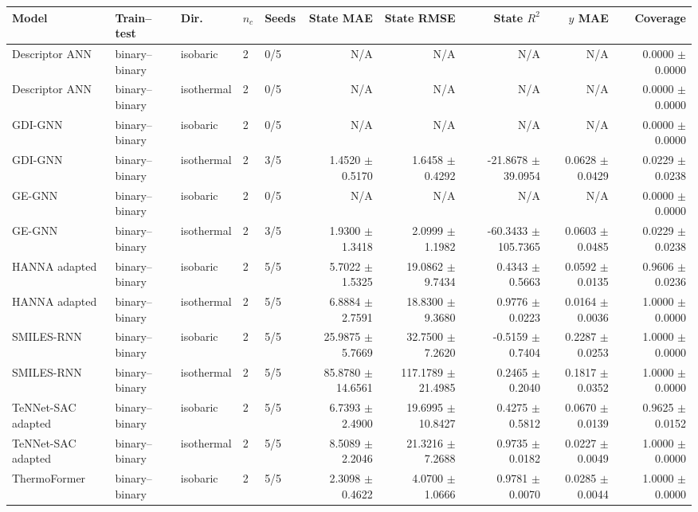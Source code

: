 \begin{tabular}{lllllrrrrr}
Model & Train--test & Dir. & $n_c$ & Seeds & State MAE & State RMSE & State $R^2$ & $y$ MAE & Coverage \\
\hline
Descriptor ANN & binary--binary & isobaric & 2 & 0/5 & N/A & N/A & N/A & N/A & 0.0000 $\pm$ 0.0000 \\
Descriptor ANN & binary--binary & isothermal & 2 & 0/5 & N/A & N/A & N/A & N/A & 0.0000 $\pm$ 0.0000 \\
GDI-GNN & binary--binary & isobaric & 2 & 0/5 & N/A & N/A & N/A & N/A & 0.0000 $\pm$ 0.0000 \\
GDI-GNN & binary--binary & isothermal & 2 & 3/5 & 1.4520 $\pm$ 0.5170 & 1.6458 $\pm$ 0.4292 & -21.8678 $\pm$ 39.0954 & 0.0628 $\pm$ 0.0429 & 0.0229 $\pm$ 0.0238 \\
GE-GNN & binary--binary & isobaric & 2 & 0/5 & N/A & N/A & N/A & N/A & 0.0000 $\pm$ 0.0000 \\
GE-GNN & binary--binary & isothermal & 2 & 3/5 & 1.9300 $\pm$ 1.3418 & 2.0999 $\pm$ 1.1982 & -60.3433 $\pm$ 105.7365 & 0.0603 $\pm$ 0.0485 & 0.0229 $\pm$ 0.0238 \\
HANNA adapted & binary--binary & isobaric & 2 & 5/5 & 5.7022 $\pm$ 1.5325 & 19.0862 $\pm$ 9.7434 & 0.4343 $\pm$ 0.5663 & 0.0592 $\pm$ 0.0135 & 0.9606 $\pm$ 0.0236 \\
HANNA adapted & binary--binary & isothermal & 2 & 5/5 & 6.8884 $\pm$ 2.7591 & 18.8300 $\pm$ 9.3680 & 0.9776 $\pm$ 0.0223 & 0.0164 $\pm$ 0.0036 & 1.0000 $\pm$ 0.0000 \\
SMILES-RNN & binary--binary & isobaric & 2 & 5/5 & 25.9875 $\pm$ 5.7669 & 32.7500 $\pm$ 7.2620 & -0.5159 $\pm$ 0.7404 & 0.2287 $\pm$ 0.0253 & 1.0000 $\pm$ 0.0000 \\
SMILES-RNN & binary--binary & isothermal & 2 & 5/5 & 85.8780 $\pm$ 14.6561 & 117.1789 $\pm$ 21.4985 & 0.2465 $\pm$ 0.2040 & 0.1817 $\pm$ 0.0352 & 1.0000 $\pm$ 0.0000 \\
TeNNet-SAC adapted & binary--binary & isobaric & 2 & 5/5 & 6.7393 $\pm$ 2.4900 & 19.6995 $\pm$ 10.8427 & 0.4275 $\pm$ 0.5812 & 0.0670 $\pm$ 0.0139 & 0.9625 $\pm$ 0.0152 \\
TeNNet-SAC adapted & binary--binary & isothermal & 2 & 5/5 & 8.5089 $\pm$ 2.2046 & 21.3216 $\pm$ 7.2688 & 0.9735 $\pm$ 0.0182 & 0.0227 $\pm$ 0.0049 & 1.0000 $\pm$ 0.0000 \\
ThermoFormer & binary--binary & isobaric & 2 & 5/5 & 2.3098 $\pm$ 0.4622 & 4.0700 $\pm$ 1.0666 & 0.9781 $\pm$ 0.0070 & 0.0285 $\pm$ 0.0044 & 1.0000 $\pm$ 0.0000 \\

\end{tabular}
